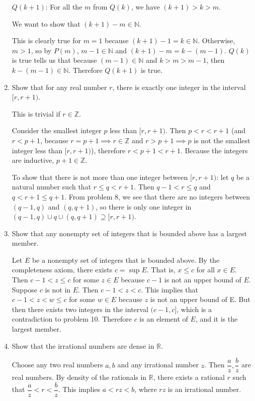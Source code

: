 \begin{enumerate}
	$Q(k+1)$: For all the $m$ from $Q(k)$, we have $(k+1)>k>m$.\par
	We want to show that $(k+1)-m \in \mathbb{N}$.\par
	This is clearly true for $m=1$ because $(k+1)-1 = k \in \mathbb{N}$. 
	Otherwise, $m>1$, so by $P(m)$, $m-1 \in \mathbb{N}$ and $(k+1)-m = k -(m-1)$.
	$Q(k)$ is true tells us that because $(m-1) \in \mathbb{N}$ and $k>m>m-1$, then $k-(m-1) \in \mathbb{N}$.
	Therefore $Q(k+1)$ is true.
	\item Show that for any real number $r$, there is exactly one integer in the interval $[r,r+1)$.\par
	This is trivial if $r \in \mathbb{Z}$.\par
	Consider the smallest integer $p$ less than $[r,r+1)$.
	Then $p<r<r+1$ (and $r<p+1$, because $r=p+1 \implies r \in \mathbb{Z}$ and $r>p+1 \implies p$ is not the smallest integer less than $[r,r+1)$), therefore $r<p+1<r+1$. Because the integers are inductive, $p+1 \in \mathbb{Z}$.\par
	To show that there is not more than one integer between $[r,r+1)$:
	let $q$ be a natural number such that $r \le q < r+1$. Then $q-1 < r \le q$ and $q< r+1 \le q+1$. 
	From problem 8, we see that there are no integers between $(q-1,q)$ and $(q,q+1)$, 
	so there is only one integer in $(q-1,q)\cup q \cup (q,q+1) \supseteq [r,r+1)$.
	\item Show that any nonempty set of integers that is bounded above has a largest member.\par
	Let $E$ be a nonempty set of integers that is bounded above. By the completeness axiom, there exists $c = \sup E$. 
	That is, $x\le c$ for all $x \in E$. Then $c-1 < z \le c$ for some $z \in E$ because $c-1$ is not an upper bound of $E$.
	Suppose $c$ is not in $E$. Then $c-1 < z < c$. 
	This implies that $c-1 < z < w \le c$ for some $w \in E$ because $z$ is not an upper bound of E.
	But then there exists two integers in the interval $(c-1,c]$, which is a contradiction to problem 10.
	Therefore $c$ is an element of $E$, and it is the largest member.
	\item Show that the irrational numbers are dense in $\mathbb{R}$.\par
	Choose any two real numbers $a,b$ and any irrational number $z$. Then $\dfrac{a}{z},\dfrac{b}{z}$ are real numbers. 
	By density of the rationals in $\mathbb{R}$, there exists a rational $r$ such that $\dfrac{a}{z}<r<\dfrac{b}{z}$. This implies $a<rz<b$, where $rz$ is an irrational number.\par

\end{enumerate}
